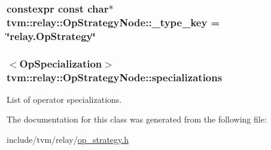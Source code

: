 \subsubsection[{\texorpdfstring{\+\_\+type\+\_\+key}{_type_key}}]{\setlength{\rightskip}{0pt plus 5cm}constexpr const char$\ast$ tvm\+::relay\+::\+Op\+Strategy\+Node\+::\+\_\+type\+\_\+key = \char`\"{}relay.\+Op\+Strategy\char`\"{}\hspace{0.3cm}{\ttfamily [static]}}\hypertarget{classtvm_1_1relay_1_1OpStrategyNode_a6b7991cb900e90a42f889359dd7956a0}{}\label{classtvm_1_1relay_1_1OpStrategyNode_a6b7991cb900e90a42f889359dd7956a0}
\subsubsection[{\texorpdfstring{specializations}{specializations}}]{$<${\bf Op\+Specialization}$>$ tvm\+::relay\+::\+Op\+Strategy\+Node\+::specializations}\hypertarget{classtvm_1_1relay_1_1OpStrategyNode_a32d7610bdfd32c485b5f579daac2aeff}{}\label{classtvm_1_1relay_1_1OpStrategyNode_a32d7610bdfd32c485b5f579daac2aeff}


List of operator specializations. 



The documentation for this class was generated from the following file\+:\begin{DoxyCompactItemize}
\item 
include/tvm/relay/\hyperlink{op__strategy_8h}{op\+\_\+strategy.\+h}\end{DoxyCompactItemize}
